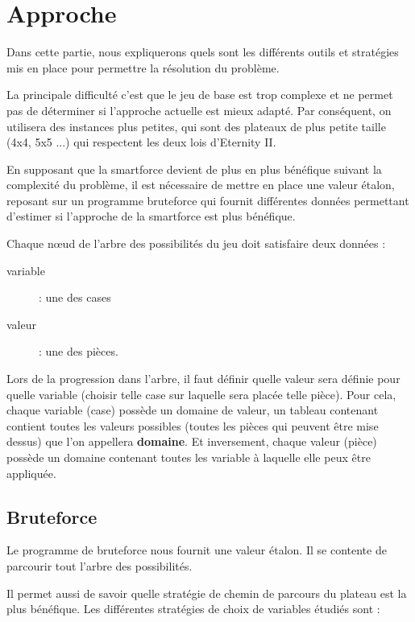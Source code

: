 
\section{Approche}

	Dans cette partie, nous expliquerons quels sont les différents outils et stratégies mis en place pour permettre la résolution du problème.
	
	La principale difficulté c'est que le jeu de base est trop complexe et ne permet pas de déterminer si l'approche actuelle est mieux adapté. Par conséquent, on utilisera des instances plus petites, qui sont des plateaux de plus petite taille (4x4, 5x5 ...) qui respectent les deux lois d'Eternity II. 
	
	En supposant que la smartforce devient de plus en plus bénéfique suivant la complexité du problème, il est nécessaire de mettre en place une valeur étalon, reposant sur un programme bruteforce qui fournit différentes données permettant d'estimer si l'approche de la smartforce est plus bénéfique.
	
	Chaque n\oe ud de l'arbre des possibilités du jeu doit satisfaire deux données :
	
	\begin{description}
		\item[variable] : une des cases
		\item[valeur] : une des pièces.
	\end{description}
	
	Lors de la progression dans l'arbre, il faut définir quelle valeur sera définie pour quelle variable (choisir telle case sur laquelle sera placée telle pièce). Pour cela, chaque variable (case) possède un domaine de valeur, un tableau contenant contient toutes les valeurs possibles (toutes les pièces qui peuvent être mise dessus) que l'on appellera \textbf{domaine}.
	Et inversement, chaque valeur (pièce) possède un domaine contenant toutes les variable à laquelle elle peux être appliquée.

	\subsection{Bruteforce}
	
	Le programme de bruteforce nous fournit une valeur étalon. Il se contente de parcourir tout l'arbre des possibilités.
	
	Il permet aussi de savoir quelle stratégie de chemin de parcours du plateau est la plus bénéfique. Les différentes stratégies de choix de variables étudiés sont :
	
